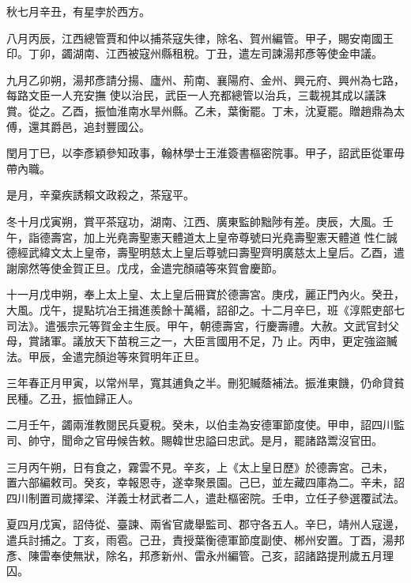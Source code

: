 \begin{pinyinscope}
 秋七月辛丑，有星孛於西方。



 八月丙辰，江西總管賈和仲以捕茶寇失律，除名、賀州編管。甲子，賜安南國王印。丁卯，蠲湖南、江西被寇州縣租稅。丁丑，遣左司諫湯邦彥等使金申議。



 九月乙卯朔，湯邦彥請分揚、廬州、荊南、襄陽府、金州、興元府、興州為七路，每路文臣一人充安撫
 使以治民，武臣一人充都總管以治兵，三載視其成以議誅賞。從之。乙酉，振恤淮南水旱州縣。乙未，葉衡罷。丁未，沈夏罷。贈趙鼎為太傅，還其爵邑，追封豐國公。



 閏月丁巳，以李彥穎參知政事，翰林學士王淮簽書樞密院事。甲子，詔武臣從軍毋帶內職。



 是月，辛棄疾誘賴文政殺之，茶寇平。



 冬十月戊寅朔，賞平茶寇功，湖南、江西、廣東監帥黜陟有差。庚辰，大風。壬午，詣德壽宮，加上光堯壽聖憲天體道太上皇帝尊號曰光堯壽聖憲天體道
 性仁誠德經武緯文太上皇帝，壽聖明慈太上皇后尊號曰壽聖齊明廣慈太上皇后。乙酉，遣謝廓然等使金賀正旦。戊戌，金遣完顏禧等來賀會慶節。



 十一月戊申朔，奉上太上皇、太上皇后冊寶於德壽宮。庚戌，麗正門內火。癸丑，大風。戊午，提點坑冶王揖進羨餘十萬緡，詔卻之。十二月辛巳，班《淳熙吏部七司法》。遣張宗元等賀金主生辰。甲午，朝德壽宮，行慶壽禮。大赦。文武官封父母，賞諸軍。議放天下苗稅三之一，大臣言國用不足，乃
 止。丙申，更定強盜贓法。甲辰，金遣完顏迨等來賀明年正旦。



 三年春正月甲寅，以常州旱，寬其逋負之半。刪犯贓蔭補法。振淮東饑，仍命貸貧民種。乙丑，振恤歸正人。



 二月壬午，蠲兩淮教閱民兵夏稅。癸未，以伯圭為安德軍節度使。甲申，詔四川監司、帥守，聞命之官毋候告敕。賜韓世忠謚曰忠武。是月，罷諸路鬻沒官田。



 三月丙午朔，日有食之，霧雲不見。辛亥，上《太上皇日歷》於德壽宮。己未，
 置六部編敕司。癸亥，幸報恩寺，遂幸聚景園。己巳，並左藏四庫為二。辛未，詔四川制置司歲擇梁、洋義士材武者二人，遣赴樞密院。壬申，立任子參選覆試法。



 夏四月戊寅，詔侍從、臺諫、兩省官歲舉監司、郡守各五人。辛巳，靖州人寇邊，遣兵討捕之。丁亥，雨雹。己丑，責授葉衡德軍節度副使、郴州安置。丁酉，湯邦彥、陳雷奉使無狀，除名，邦彥新州、雷永州編管。己亥，詔諸路提刑歲五月理囚。




\end{pinyinscope}
